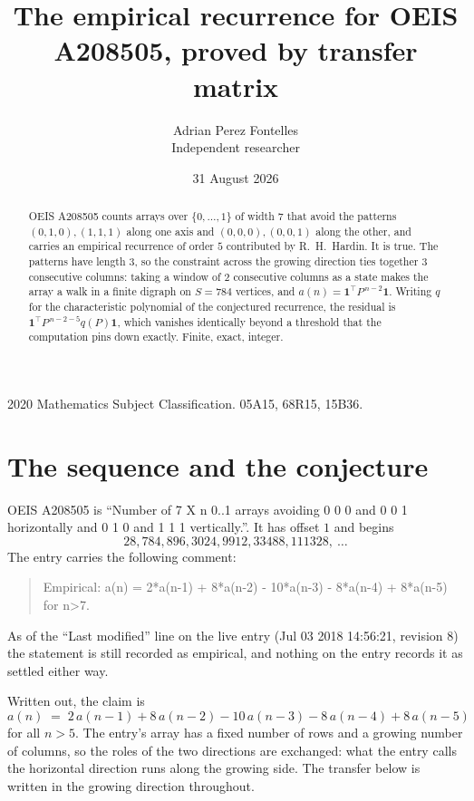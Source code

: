 \documentclass[11pt,a4paper]{article}
\title{The empirical recurrence for OEIS A208505, proved by transfer matrix}
\author{Adrian Perez Fontelles\\ \small Independent researcher}
\date{31 August 2026}
\theoremstyle{plain}
\theoremstyle{definition}
\begin{document}
\maketitle

\begin{abstract}
OEIS A208505 counts arrays over $\{0,\dots,1\}$ of width $7$ that avoid the patterns
$(0,1,0), (1,1,1)$ along one axis and $(0,0,0), (0,0,1)$ along the other, and carries an empirical recurrence of
order $5$ contributed by R.~H.~Hardin. It is true. The patterns have length $3$, so
the constraint across the growing direction ties together $3$ consecutive columns: taking a
window of $2$ consecutive columns as a state makes the array a walk in a finite digraph
on $S=784$ vertices, and $a(n)=\mathbf{1}^{\!\top}P^{\,n-2}\mathbf{1}$. Writing $q$
for the characteristic polynomial of the conjectured recurrence, the residual is
$\mathbf{1}^{\!\top}P^{\,n-2-5}q(P)\mathbf{1}$, which vanishes identically
beyond a threshold that the computation pins down exactly. Finite, exact, integer.
\end{abstract}

\noindent\small 2020 Mathematics Subject Classification. 05A15, 68R15, 15B36.\normalsize

\section{The sequence and the conjecture}

OEIS A208505 is ``Number of 7 X n 0..1 arrays avoiding 0 0 0 and 0 0 1 horizontally and 0 1 0 and 1 1 1 vertically.''. It has offset
$1$ and begins
\[
28, 784, 896, 3024, 9912, 33488, 111328,\ \dots
\]
The entry carries the following comment:
\begin{quote}\small
Empirical: a(n) = 2*a(n-1) + 8*a(n-2) - 10*a(n-3) - 8*a(n-4) + 8*a(n-5) for n>7.
\end{quote}
As of the ``Last modified'' line on the live entry (Jul 03 2018 14:56:21, revision
8) the statement is still recorded as empirical, and nothing on the entry
records it as settled either way.

Written out, the claim is
\begin{equation}\label{eq:conj}
a(n)\;=\;2\,a(n-1) + 8\,a(n-2) - 10\,a(n-3) - 8\,a(n-4) + 8\,a(n-5)
\end{equation}
for all $n>5$. The entry's array has a fixed number of rows and a growing number of
columns, so the roles of the two directions are exchanged: what the entry calls the
horizontal direction runs along the growing side. The transfer below is written in the
growing direction throughout.
\end{document}
